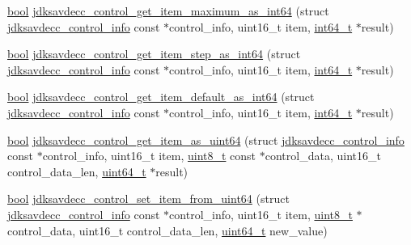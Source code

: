 \begin{DoxyCompactItemize}
\item 
\hyperlink{avb__gptp_8h_af6a258d8f3ee5206d682d799316314b1}{bool} \hyperlink{group__aem__control__value__helpers_gab8fa4a999331e14e6247370954276d71}{jdksavdecc\+\_\+control\+\_\+get\+\_\+item\+\_\+maximum\+\_\+as\+\_\+int64} (struct \hyperlink{structjdksavdecc__control__info}{jdksavdecc\+\_\+control\+\_\+info} const $\ast$control\+\_\+info, uint16\+\_\+t item, \hyperlink{parse_8c_a67a9885ef4908cb72ce26d75b694386c}{int64\+\_\+t} $\ast$result)
\item 
\hyperlink{avb__gptp_8h_af6a258d8f3ee5206d682d799316314b1}{bool} \hyperlink{group__aem__control__value__helpers_ga15497bfc6db695a6325ee691a2c7e07a}{jdksavdecc\+\_\+control\+\_\+get\+\_\+item\+\_\+step\+\_\+as\+\_\+int64} (struct \hyperlink{structjdksavdecc__control__info}{jdksavdecc\+\_\+control\+\_\+info} const $\ast$control\+\_\+info, uint16\+\_\+t item, \hyperlink{parse_8c_a67a9885ef4908cb72ce26d75b694386c}{int64\+\_\+t} $\ast$result)
\item 
\hyperlink{avb__gptp_8h_af6a258d8f3ee5206d682d799316314b1}{bool} \hyperlink{group__aem__control__value__helpers_ga1a743eb100bac7242abf21a656bd80e2}{jdksavdecc\+\_\+control\+\_\+get\+\_\+item\+\_\+default\+\_\+as\+\_\+int64} (struct \hyperlink{structjdksavdecc__control__info}{jdksavdecc\+\_\+control\+\_\+info} const $\ast$control\+\_\+info, uint16\+\_\+t item, \hyperlink{parse_8c_a67a9885ef4908cb72ce26d75b694386c}{int64\+\_\+t} $\ast$result)
\item 
\hyperlink{avb__gptp_8h_af6a258d8f3ee5206d682d799316314b1}{bool} \hyperlink{group__aem__control__value__helpers_gae6ced63551e135132e4720340bbe4b5b}{jdksavdecc\+\_\+control\+\_\+get\+\_\+item\+\_\+as\+\_\+uint64} (struct \hyperlink{structjdksavdecc__control__info}{jdksavdecc\+\_\+control\+\_\+info} const $\ast$control\+\_\+info, uint16\+\_\+t item, \hyperlink{stdint_8h_aba7bc1797add20fe3efdf37ced1182c5}{uint8\+\_\+t} const $\ast$control\+\_\+data, uint16\+\_\+t control\+\_\+data\+\_\+len, \hyperlink{parse_8c_aec6fcb673ff035718c238c8c9d544c47}{uint64\+\_\+t} $\ast$result)
\item 
\hyperlink{avb__gptp_8h_af6a258d8f3ee5206d682d799316314b1}{bool} \hyperlink{group__aem__control__value__helpers_ga5f4df232de3090533463d7e1aabb0070}{jdksavdecc\+\_\+control\+\_\+set\+\_\+item\+\_\+from\+\_\+uint64} (struct \hyperlink{structjdksavdecc__control__info}{jdksavdecc\+\_\+control\+\_\+info} const $\ast$control\+\_\+info, uint16\+\_\+t item, \hyperlink{stdint_8h_aba7bc1797add20fe3efdf37ced1182c5}{uint8\+\_\+t} $\ast$control\+\_\+data, uint16\+\_\+t control\+\_\+data\+\_\+len, \hyperlink{parse_8c_aec6fcb673ff035718c238c8c9d544c47}{uint64\+\_\+t} new\+\_\+value)

\end{DoxyCompactItemize}
